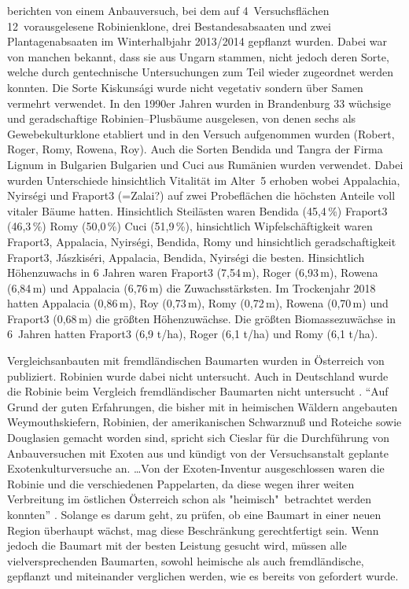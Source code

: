 \documentclass[twocolumn]{scrartcl}
\begin{document}
\citet{hofmann2020robinie,lange2021robinie} berichten von einem
Anbauversuch, bei dem auf 4~Versuchsflächen 12~vorausgelesene
Robinienklone, drei Bestandesabsaaten und zwei Plantagenabsaaten im
Winterhalbjahr 2013/2014 gepflanzt wurden. Dabei war von manchen
bekannt, dass sie aus Ungarn stammen, nicht jedoch deren Sorte, welche
durch gentechnische Untersuchungen zum Teil wieder zugeordnet werden
konnten. Die Sorte Kiskunsági wurde nicht vegetativ sondern über Samen
vermehrt verwendet. In den 1990er Jahren wurden in Brandenburg 33
wüchsige und geradschaftige Robinien--Plusbäume ausgelesen, von denen
sechs als Gewebekulturklone etabliert und in den Versuch aufgenommen
wurden (Robert, Roger, Romy, Rowena, Roy). Auch die Sorten Bendida und
Tangra der Firma Lignum in Bulgarien Bulgarien und Cuci aus Rumänien
wurden verwendet. Dabei wurden Unterschiede hinsichtlich Vitalität im
Alter~5 erhoben wobei Appalachia, Nyirségi und Fraport3 (=Zalai?) auf
zwei Probeflächen die höchsten Anteile voll vitaler Bäume
hatten. Hinsichtlich Steilästen waren Bendida (45,4\,\%) Fraport3
(46,3\,\%) Romy (50,0\,\%) Cuci (51,9\,\%), hinsichtlich
Wipfelschäftigkeit waren Fraport3, Appalacia, Nyirségi, Bendida, Romy
und hinsichtlich geradschaftigkeit Fraport3, Jászkiséri, Appalacia,
Bendida, Nyirségi die besten.  Hinsichtlich Höhenzuwachs in 6 Jahren
waren Fraport3 (7,54\,m), Roger (6,93\,m), Rowena (6,84\,m) und
Appalacia (6,76\,m) die Zuwachsstärksten. Im Trockenjahr 2018 hatten
Appalacia (0,86\,m), Roy (0,73\,m), Romy (0,72\,m), Rowena (0,70\,m)
und Fraport3 (0,68\,m) die größten Höhenzuwächse.  Die größten
Biomassezuwächse in 6~Jahren hatten Fraport3 (6,9 t/ha), Roger (6,1
t/ha) und Romy (6,1 t/ha).

Vergleichsanbauten mit fremdländischen Baumarten wurden in Österreich
von \citet{cieslar1901FremdlaendischeHolzarten} publiziert. Robinien
wurde dabei nicht untersucht. Auch in Deutschland wurde die Robinie
beim Vergleich fremdländischer Baumarten
nicht untersucht \citep{schwappach1902fremdlaendischeHolzarten}.
\enquote{Auf Grund der guten Erfahrungen, die bisher mit in heimischen
Wäldern angebauten Weymouthskiefern, Robinien, der amerikanischen
Schwarznuß und Roteiche sowie Douglasien gemacht worden sind, spricht
sich Cieslar für die Durchführung von Anbauversuchen mit Exoten aus
und kündigt von der Versuchsanstalt geplante Exotenkulturversuche
an. \dots Von der Exoten-Inventur ausgeschlossen waren die Robinie und
die verschiedenen Pappelarten, da diese wegen ihrer weiten Verbreitung
im östlichen Österreich schon als "heimisch"\ betrachtet werden
konnten} \citep{rannert1979FremdlaendischeBaumarten}. Solange es
darum geht, zu prüfen, ob eine Baumart in einer neuen Region überhaupt
wächst, mag diese Beschränkung gerechtfertigt sein.
Wenn jedoch die Baumart mit der besten Leistung gesucht wird,
müssen alle vielversprechenden Baumarten,
sowohl heimische als auch fremdländische, gepflanzt und miteinander verglichen werden,
wie es bereits von \citet{reaumur1721ertragstafel} gefordert wurde.
\end{document}
